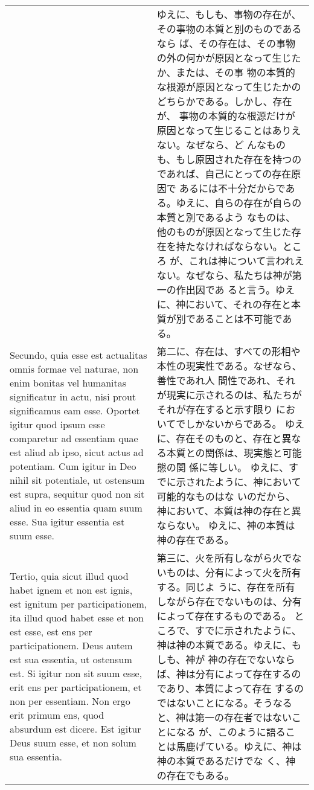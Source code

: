 \documentclass[10pt]{jsarticle} %
\begin{document}
\begin{longtable}{p{21em}p{21em}}
&

ゆえに、もしも、事物の存在が、その事物の本質と別のものであるなら
 ば、その存在は、その事物の外の何かが原因となって生じたか、または、その事
 物の本質的な根源が原因となって生じたかのどちらかである。しかし、存在が、
 事物の本質的な根源だけが原因となって生じることはありえない。なぜなら、ど
 んなものも、もし原因された存在を持つのであれば、自己にとっての存在原因で
 あるには不十分だからである。ゆえに、自らの存在が自らの本質と別であるよう
 なものは、他のものが原因となって生じた存在を持たなければならない。ところ
 が、これは神について言われえない。なぜなら、私たちは神が第一の作出因であ
 ると言う。ゆえに、神において、それの存在と本質が別であることは不可能であ
 る。

\\

Secundo, quia esse est actualitas omnis formae vel naturae, non enim
 bonitas vel humanitas significatur in actu, nisi prout significamus eam
 esse.
Oportet igitur quod ipsum esse comparetur ad essentiam quae est aliud ab
 ipso, sicut actus ad potentiam.
Cum igitur in Deo nihil sit potentiale, ut ostensum est supra, sequitur
 quod non sit aliud in eo essentia quam suum esse.
Sua igitur essentia est suum esse.

&


第二に、存在は、すべての形相や本性の現実性である。なぜなら、善性であれ人
 間性であれ、それが現実に示されるのは、私たちがそれが存在すると示す限り
 においてでしかないからである。
ゆえに、存在そのものと、存在と異なる本質との関係は、現実態と可能態の関
 係に等しい。
ゆえに、すでに示されたように、神において可能的なものはな
 いのだから、神において、本質は神の存在と異ならない。
ゆえに、神の本質は神の存在である。

\\


Tertio, quia sicut illud quod habet ignem et non est ignis, est ignitum
 per participationem, ita illud quod habet esse et non est esse, est ens
 per participationem.  Deus autem est sua essentia, ut ostensum est.  Si
 igitur non sit suum esse, erit ens per participationem, et non per
 essentiam.  Non ergo erit primum ens, quod absurdum est dicere.  Est
 igitur Deus suum esse, et non solum sua essentia.


&

第三に、火を所有しながら火でないものは、分有によって火を所有する。同じよ
うに、存在を所有しながら存在でないものは、分有によって存在するものである。
ところで、すでに示されたように、神は神の本質である。ゆえに、もしも、神が
神の存在でないならば、神は分有によって存在するのであり、本質によって存在
するのではないことになる。そうなると、神は第一の存在者ではないことになる
が、このように語ることは馬鹿げている。ゆえに、神は神の本質であるだけでな
く、神の存在でもある。



\end{longtable}
\end{document}
